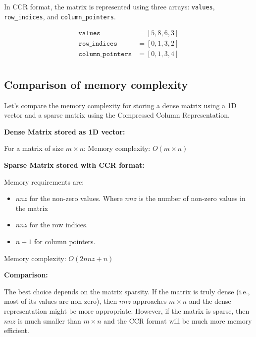 In CCR format, the matrix is represented using three arrays:
\texttt{values}, \texttt{row\_indices}, and \texttt{column\_pointers}.

\begin{align*}
    \texttt{values}           & = [5, 8, 6, 3] \\
    \texttt{row\_indices}     & = [0, 1, 3, 2] \\
    \texttt{column\_pointers} & = [0, 1, 3, 4] \\
\end{align*}


\subsection{Comparison of memory complexity}
Let's compare the memory complexity for storing a
dense matrix using a 1D vector and a sparse matrix using the Compressed Column Representation.

\textbf{Dense Matrix stored as 1D vector:}

For a matrix of size \( m \times n \):
Memory complexity: \( O(m \times n) \)

\textbf{Sparse Matrix stored with CCR format:}

Memory requirements are:
\begin{itemize}
    \item \( nnz \) for the non-zero values. Where $nnz$ is the number of non-zero values in the matrix
    \item \( nnz \) for the row indices.
    \item \( n+1 \) for column pointers.
\end{itemize}

Memory complexity: \( O(2nnz + n) \)

\textbf{Comparison:}

The best choice depends on the matrix sparsity.
If the matrix is truly dense (i.e., most of its values are non-zero), then $nnz$ approaches $m \times n$ and the dense
representation might be more appropriate. However, if the matrix is sparse, then $nnz$ is much smaller than $m \times n$
and the CCR format will be much more memory efficient.
